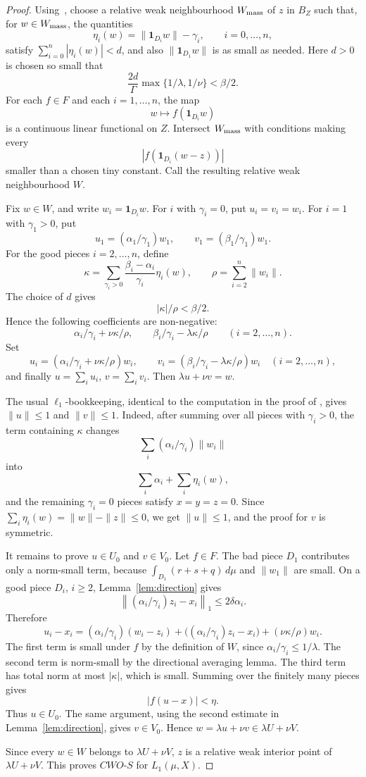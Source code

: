 \documentclass[11pt]{article}
\newcommand{\CWOS}{\textit{CWO-S}}
\newcommand{\one}{\mathbf 1}
\begin{document}
\begin{proof}
Using~\cite[Lemma 2.2(b)]{HKP25}, choose a relative weak neighbourhood
\(W_{\rm mass}\) of \(z\) in \(B_Z\) such that, for \(w\in W_{\rm mass}\),
the quantities
\[
  \eta_i(w)=\|\one_{D_i}w\|-\gamma_i,\qquad i=0,\dots,n,
\]
satisfy \(\sum_{i=0}^n|\eta_i(w)|<d\), and also
\(\|\one_{D_1}w\|\) is as small as needed.  Here \(d>0\) is chosen so small
that
\[
  \frac{2d}{\Gamma}\max\{1/\lambda,1/\nu\}<\beta/2.
\]
For each \(f\in F\) and each \(i=1,\dots,n\), the map
\[
  w\mapsto f(\one_{D_i}w)
\]
is a continuous linear functional on \(Z\).  Intersect \(W_{\rm mass}\) with
conditions making every
\[
  |f(\one_{D_i}(w-z))|
\]
smaller than a chosen tiny constant.  Call the resulting relative weak
neighbourhood \(W\).

Fix \(w\in W\), and write \(w_i=\one_{D_i}w\).  For \(i\) with
\(\gamma_i=0\), put \(u_i=v_i=w_i\).  For \(i=1\) with \(\gamma_1>0\), put
\[
  u_1=(\alpha_1/\gamma_1)w_1,\qquad
  v_1=(\beta_1/\gamma_1)w_1.
\]
For the good pieces \(i=2,\dots,n\), define
\[
  \kappa=\sum_{\gamma_i>0}\frac{\beta_i-\alpha_i}{\gamma_i}\eta_i(w),
  \qquad
  \rho=\sum_{i=2}^n\|w_i\|.
\]
The choice of \(d\) gives
\[
  |\kappa|/\rho<\beta/2.
\]
Hence the following coefficients are non-negative:
\[
  \alpha_i/\gamma_i+\nu\kappa/\rho,\qquad
  \beta_i/\gamma_i-\lambda\kappa/\rho\qquad(i=2,\dots,n).
\]
Set
\[
  u_i=\left(\alpha_i/\gamma_i+\nu\kappa/\rho\right)w_i,\qquad
  v_i=\left(\beta_i/\gamma_i-\lambda\kappa/\rho\right)w_i
  \quad (i=2,\dots,n),
\]
and finally \(u=\sum_i u_i\), \(v=\sum_i v_i\).
Then \(\lambda u+\nu v=w\).

The usual \(\ell_1\)-bookkeeping, identical to the computation in the proof of
\cite[Theorem 1.1]{HKP25}, gives \(\|u\|\le1\) and \(\|v\|\le1\).  Indeed,
after summing over all pieces with \(\gamma_i>0\), the term containing
\(\kappa\) changes
\[
  \sum_i(\alpha_i/\gamma_i)\|w_i\|
\]
into
\[
  \sum_i\alpha_i+\sum_i\eta_i(w),
\]
and the remaining \(\gamma_i=0\) pieces satisfy \(x=y=z=0\).  Since
\(\sum_i\eta_i(w)=\|w\|-\|z\|\le0\), we get \(\|u\|\le1\), and the proof for
\(v\) is symmetric.

It remains to prove \(u\in U_0\) and \(v\in V_0\).  Let \(f\in F\).  The bad
piece \(D_1\) contributes only a norm-small term, because
\(\int_{D_1}(r+s+q)\,d\mu\) and \(\|w_1\|\) are small.  On a good piece
\(D_i\), \(i\ge2\), Lemma~\ref{lem:direction} gives
\[
  \left\|(\alpha_i/\gamma_i)z_i-x_i\right\|_1\le2\delta\alpha_i.
\]
Therefore
\[
  u_i-x_i
  =(\alpha_i/\gamma_i)(w_i-z_i)
    +\bigl((\alpha_i/\gamma_i)z_i-x_i\bigr)
    +(\nu\kappa/\rho)w_i .
\]
The first term is small under \(f\) by the definition of \(W\), since
\(\alpha_i/\gamma_i\le1/\lambda\).  The second term is norm-small by the
directional averaging lemma.  The third term has total norm at most
\(|\kappa|\), which is small.  Summing over the finitely many pieces gives
\[
  |f(u-x)|<\eta.
\]
Thus \(u\in U_0\).  The same argument, using the second estimate in
Lemma~\ref{lem:direction}, gives \(v\in V_0\).  Hence \(w=\lambda u+\nu v\in
\lambda U+\nu V\).

Since every \(w\in W\) belongs to \(\lambda U+\nu V\), \(z\) is a relative
weak interior point of \(\lambda U+\nu V\).  This proves \(\CWOS\) for
\(L_1(\mu,X)\).
\end{proof}
\end{document}
